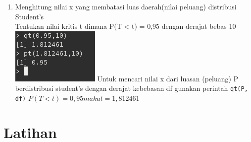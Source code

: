 \documentclass[a4paper,12pt]{article}
\begin{document}
\begin{enumerate}[label=\textbf{\Alph*.}]
\item Menghitung nilai x yang membatasi luas daerah(nilai peluang) distribusi Student’s\\
    Tentukan nilai kritis t dimana P(T < t) = 0,95 dengan derajat bebas 10\\
    \includegraphics{prakf}
    Untuk mencari nilai x dari luasan (peluang) P berdistribusi 
     student’s dengan derajat kebebasan df gunakan perintah \texttt{qt(P, df)} 
     $P(T < t) = 0,95 maka t = 1,812461$

\end{enumerate}

\section{Latihan}
\end{document}
